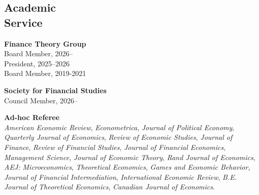 \documentclass[margin,line,11pt]{resume}
\begin{document}
\begin{resume}
    \section{\mysidestyle Academic\\ Service}

  {\bf Finance Theory Group} \\
    Board Member, 2026-- \\
    President, 2025--2026 \\
     Board Member,   2019-2021 

     {\bf Society for Financial Studies} \\
     Council Member, 2026-- 

     {\bf Ad-hoc Referee} \\
     {\it American Economic Review},  {\it Econometrica},  {\it Journal of Political Economy}, {\it Quarterly Journal of Economics}, {\it Review of Economic Studies}, {\it Journal of Finance}, {\it Review of Financial Studies}, {\it Journal of Financial Economics}, {\it Management Science}, {\it Journal of Economic Theory}, {\it Rand Journal of Economics}, {\it AEJ: Microeconomics},  {\it Theoretical Economics}, {\it Games and Economic Behavior}, {\it Journal of Financial Intermediation}, {\it International Economic Review}, {\it B.E. Journal of Theoretical Economics}, {\it Canadian Journal of Economics}.

   






\end{resume}
\end{document}
